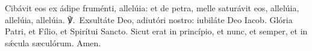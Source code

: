 Cibávit eos ex ádipe fruménti, allelúia: et de petra, melle saturávit eos, allelúia, allelúia, allelúia.
℣. Exsultáte Deo, adiutóri nostro: iubiláte Deo Iacob.
Glória Patri, et Fílio, et Spirítui Sancto.
Sicut erat in princípio, et nunc, et semper, et in sǽcula sæculórum. Amen.
